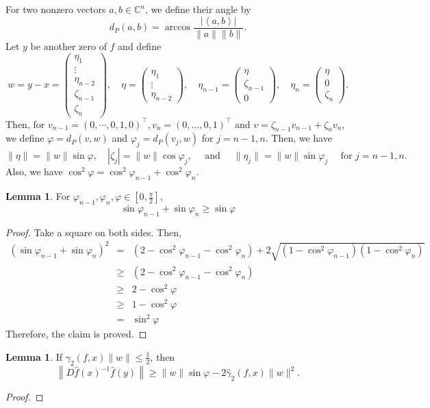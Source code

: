 \documentclass[12pt,oneside,reqno]{amsart}
\theoremstyle{definition}
\newtheorem{lem}[thm]{Lemma}
\begin{document}
For two nonzero vectors $a,b\in \mathbb{C}^n$, we define their angle by
\[d_P(a,b)=\arccos\frac{|\left<a,b\right>|}{\|a\|\|b\|}.\]
Let $y$ be another zero of $f$ and define
\[w=y-x=\left(\begin{array}{c}
\eta_1\\
\vdots\\
\eta_{n-2}\\
\zeta_{n-1}\\
\zeta_n
\end{array}\right),\quad \eta=\left(\begin{array}{c}
\eta_1\\
\vdots\\
\eta_{n-2}
\end{array}\right),\quad\eta_{n-1}=\left(\begin{array}{c}
\eta\\
\zeta_{n-1}\\
0
\end{array}\right),\quad \eta_{n}=\left(\begin{array}{c}
\eta\\
0\\
\zeta_{n}
\end{array}\right).\]
Then, for $v_{n-1}=(0,\cdots,0,1,0)^\top, v_n=(0,\dots,0,1)^\top$ and $v=\zeta_{n-1}v_{n-1}+\zeta_n v_n$, we define $\varphi=d_P(v,w)$ and $\varphi_j=d_P(v_j,w)$ for $j=n-1,n$. Then, we have
\[\|\eta\|=\|w\|\sin\varphi,\quad |\zeta_j|=\|w\|\cos\varphi_j,\quad\text{ and }\quad\|\eta_j\|=\|w\|\sin\varphi_j \quad\text{ for }j=n-1,n.\]
Also, we have $\cos^2\varphi = \cos ^2\varphi_{n-1}+\cos^2\varphi_n$.
\begin{lem}\label{lem:sinIneq}
	For $\varphi_{n-1},\varphi_n,\varphi \in [0,\frac{\pi}{2}]$,
	\[\sin\varphi_{n-1}+\sin\varphi_n\geq \sin \varphi\]
\end{lem}
\begin{proof}
	Take a square on both sides. Then,
	\begin{eqnarray*}
		\left(\sin\varphi_{n-1}+\sin\varphi_n\right)^2& = & \left(2-\cos^2\varphi_{n-1}-\cos^2\varphi_n\right)+2\sqrt{\left(1-\cos^2\varphi_{n-1}\right)\left(1-\cos^2\varphi_n\right)}\\
		&\geq & \left(2-\cos^2\varphi_{n-1}-\cos^2\varphi_n\right)\\
		& \geq & 2-\cos^2 \varphi\\
		& \geq & 1-\cos^2 \varphi\\
		& = & \sin^2 \varphi
	\end{eqnarray*}
	Therefore, the claim is proved.
\end{proof}
\begin{lem}\cite[Lemma 1]{hao2017computing}\label{lem:bigAngleCase}
	If $\gamma_2(f,x)\|w\|\leq \frac{1}{2}$, then
	\[\left\|D\hat{f}(x)^{-1}\hat{f}(y)\right\|\geq \|w\|\sin\varphi -2\hat{\gamma}_2(f,x)\|w\|^2.\]
\end{lem}
\begin{proof}
\end{proof}
\end{document}
